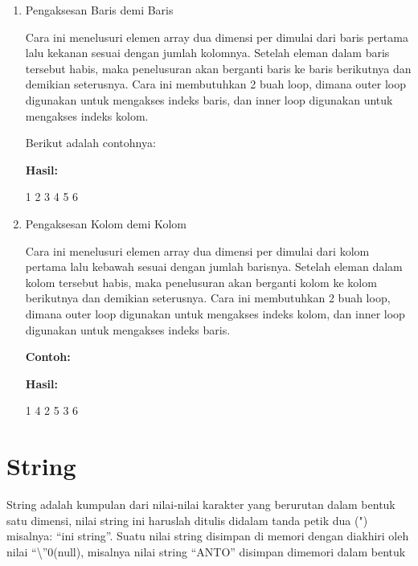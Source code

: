 \begin{enumerate}
\item Pengaksesan Baris demi Baris

Cara ini menelusuri elemen array dua dimensi per dimulai dari baris
pertama lalu kekanan sesuai dengan jumlah kolomnya. Setelah eleman dalam
baris tersebut habis, maka penelusuran akan berganti baris ke baris
berikutnya dan demikian seterusnya. Cara ini membutuhkan 2 buah loop,
dimana outer loop digunakan untuk mengakses indeks baris, dan inner loop
digunakan untuk mengakses indeks kolom.

Berikut adalah contohnya:



\textbf{Hasil:}

\begin{lcverbatim}
1 2 3
4 5 6
\end{lcverbatim}

\item Pengaksesan Kolom demi Kolom

Cara ini menelusuri elemen array dua dimensi per dimulai dari kolom
pertama lalu kebawah sesuai dengan jumlah barisnya. Setelah eleman dalam
kolom tersebut habis, maka penelusuran akan berganti kolom ke kolom
berikutnya dan demikian seterusnya. Cara ini membutuhkan 2 buah loop,
dimana outer loop digunakan untuk mengakses indeks kolom, dan inner loop
digunakan untuk mengakses indeks baris.

\textbf{Contoh:}



\textbf{Hasil:}

\begin{lcverbatim}
1 4
2 5
3 6
\end{lcverbatim}

\end{enumerate}







\section{String}\label{string}

String adalah kumpulan dari nilai-nilai karakter yang berurutan dalam
bentuk satu dimensi, nilai string ini haruslah ditulis didalam tanda
petik dua (") misalnya: ``ini string''. Suatu nilai string disimpan di
memori dengan diakhiri oleh nilai ``\textbackslash{}''0(null), misalnya nilai string
``ANTO'' disimpan dimemori dalam bentuk

